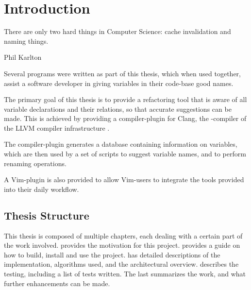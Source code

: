 \chapter{Introduction}
\label{chap:Introduction}

\epigraph{There are only two hard things in Computer Science: cache invalidation
	and naming things.}{Phil Karlton}

Several programs were written as part of this thesis, which when used together,
assist a software developer in giving variables in their \CC{} code-base good
names.

The primary goal of this thesis is to provide a refactoring tool that is aware
of all variable declarations and their relations, so that accurate suggestions
can be made. This is achieved by providing a compiler-plugin for Clang, the
\CC{}-compiler of the LLVM compiler infrastructure \cite{llvm}.

The compiler-plugin generates a database containing information on variables,
which are then used by a set of scripts to suggest variable names, and to
perform renaming operations.

A Vim-plugin is also provided to allow Vim-users to integrate the tools provided
into their daily workflow.

\section{Thesis Structure}
This thesis is composed of multiple chapters, each dealing with a certain part
of the work involved.
 provides the motivation for this project.
 provides a guide on how to build, install and use the
project.
 has detailed descriptions of the implementation,
algorithms used, and the architectural overview.
 describes the testing, including a list of tests written.
The last  summarizes the work, and what further
enhancements can be made.
